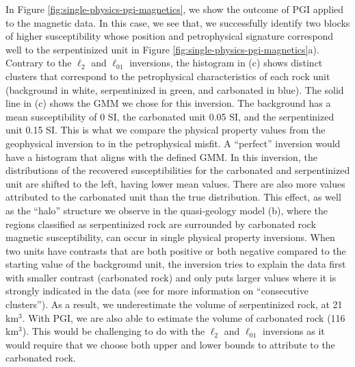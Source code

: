 \documentclass[
    paper,
  ]{geophysics}
\begin{document}
In Figure \ref{fig:single-physics-pgi-magnetics}, we show the outcome of PGI applied to the magnetic data. In this case, we see that, we successfully identify two blocks of higher susceptibility whose position and petrophysical signature correspond well to the serpentinized unit in Figure \ref{fig:single-physics-pgi-magnetics}a). Contrary to the $\ell_2$ and $\ell_{01}$ inversions, the histogram in (c) shows distinct clusters that correspond to the petrophysical characteristics of each rock unit (background in white, serpentinized in green, and carbonated in blue). The solid line in (c) shows the GMM we chose for this inversion. The background has a mean susceptibility of 0 SI, the carbonated unit 0.05 SI, and the serpentinized unit 0.15 SI. This is what we compare the physical property values from the geophysical inversion to in the petrophysical misfit. A ``perfect'' inversion would have a histogram that aligns with the defined GMM. In this inversion, the distributions of the recovered susceptibilities for the carbonated and serpentinized unit are shifted to the left, having lower mean values. There are also more values attributed to the carbonated unit than the true distribution. This effect, as well as the ``halo'' structure we observe in the quasi-geology model (b), where the regions classified as serpentinized rock are surrounded by carbonated rock magnetic susceptibility, can occur in single physical property inversions. When two units have contrasts that are both positive or both negative compared to the starting value of the background unit, the inversion tries to explain the data first with smaller contrast (carbonated rock) and only puts larger values where it is strongly indicated in the data (see \citet{AsticThesis} for more information on ``consecutive clusters''). As a result, we underestimate the volume of serpentinized rock, at 21 km$^3$. With PGI, we are also able to estimate the volume of carbonated rock (116 km$^3$). This would be challenging to do with the $\ell_2$ and $\ell_{01}$ inversions as it would require that we choose both upper and lower bounds to attribute to the carbonated rock.



\end{document}
